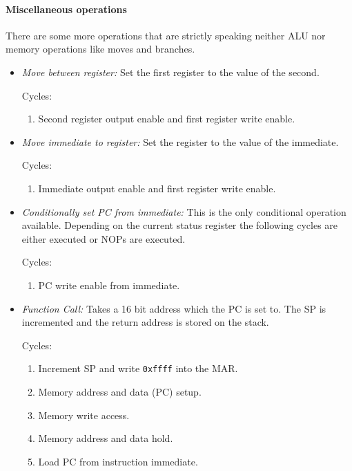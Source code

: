 \paragraph*{Miscellaneous operations}
There are some more operations that are strictly speaking neither \gls{ALU} nor memory operations like moves and branches.
\begin{itemize}
  \item \emph{Move between register:} Set the first register to the value of the second.

  Cycles:
  \begin{enumerate}
    \item Second register output enable and first register write enable.
  \end{enumerate}

  \item \emph{Move immediate to register:} Set the register to the value of the immediate.

  Cycles:
  \begin{enumerate}
    \item Immediate output enable and first register write enable.
  \end{enumerate}

  \item \emph{Conditionally set \gls{PC} from immediate:} This is the only conditional operation available.
  Depending on the current status register the following cycles are either executed or \glspl{NOP} are executed.

  Cycles:
  \begin{enumerate}
    \item \gls{PC} write enable from immediate.
  \end{enumerate}

  \item \emph{Function Call:} Takes a 16 bit address which the \gls{PC} is set to.
  The \gls{SP} is incremented and the return address is stored on the stack.

  Cycles:
  \begin{enumerate}
    \item Increment \gls{SP} and write \texttt{0xffff} into the \gls{MAR}.
    \item Memory address and data (\gls{PC}) setup.
    \item Memory write access.
    \item Memory address and data hold.
    \item Load \gls{PC} from instruction immediate.
  \end{enumerate}


\end{itemize}

